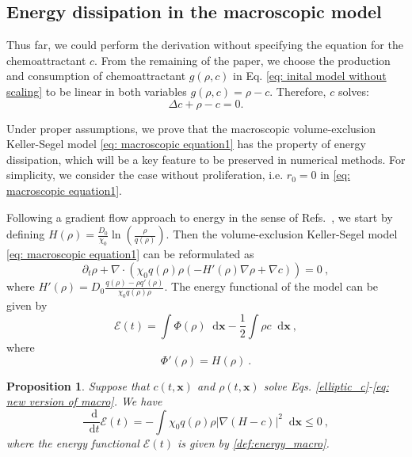 \documentclass{aims} %
\newtheorem{proposition}[theorem]{Proposition}
\theoremstyle{definition}
\newcommand {\bx} { {\mathbf{x}} }
\newcommand*\diff{\mathop{}\!\mathrm{d}}
\begin{document}
\subsection{Energy dissipation in the macroscopic model} \label{subsec:energy}
Thus far, we could perform the derivation without specifying the equation for the chemoattractant $c$. From the remaining of the paper, we choose the production and consumption of chemoattractant $g(\rho,c)$ in Eq. \eqref{eq: inital model without scaling} to be linear in both variables $g(\rho,c) = \rho - c$. Therefore, $c$ solves:
\begin{equation}\label{elliptic_c}
   \Delta c + \rho - c = 0. 
\end{equation}

Under proper assumptions, we prove that the macroscopic volume-exclusion Keller-Segel model \eqref{eq: macroscopic equation1} has the property of energy dissipation, which will be a key feature to be preserved in numerical methods.
 For simplicity, we consider the case without proliferation, i.e. $r_0 = 0$ in \eqref{eq: macroscopic equation1}. 

Following a gradient flow approach to energy in the sense of Refs.~\cite{calvez2006volume,carrillo2001entropy,de2018energy}, we start by defining $H(\rho) = \frac{D_0}{\chi_0}\ln\left(\frac{\rho}{q(\rho)}\right)$. %
Then the volume-exclusion Keller-Segel model \eqref{eq: macroscopic equation1} can be reformulated as 
\begin{equation}
    \partial_t\rho+\nabla\cdot(\chi_0 q(\rho)\rho(-H'(\rho)\nabla\rho+\nabla c))= 0\ , \label{eq: new version of macro}
\end{equation}
where $H'(\rho)=D_0\frac{q(\rho)-\rho q'(\rho)}{\chi_0 q(\rho)\rho}$.
The energy functional of the model can be given by {{
\begin{equation}\label{def:energy_macro}
    \mathcal{E}(t)=\int\Phi(\rho)\diff \mathbf{x}-\frac{1}{2}\int\rho c\diff \mathbf{x}\ ,
\end{equation}
}}
where 
\begin{equation}\label{functionPhi}
    \Phi'(\rho)=H(\rho)\ .
\end{equation}


\begin{proposition}\label{prop:energy}
Suppose that $c(t,\mathbf{x})$ and $\rho(t,\mathbf{x})$ solve Eqs. \eqref{elliptic_c}-\eqref{eq: new version of macro}. We have
\begin{equation}
    \frac{\diff}{\diff t}\mathcal{E}(t)=-\int \chi_0 q(\rho)\rho|\nabla(H-c)|^2\diff \bx\leq 0\ ,
\end{equation}
where the energy functional $\mathcal{E}(t)$ is given by \eqref{def:energy_macro}.
\end{proposition}
\end{document}
